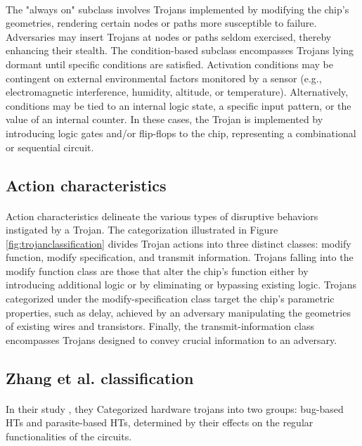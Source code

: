 \paragraph*{}
The "always on" subclass involves Trojans implemented by modifying the chip's geometries, rendering certain nodes or paths more susceptible to failure. Adversaries may insert Trojans at nodes or paths seldom exercised, thereby enhancing their stealth. The condition-based subclass encompasses Trojans lying dormant until specific conditions are satisfied. Activation conditions may be contingent on external environmental factors monitored by a sensor (e.g., electromagnetic interference, humidity, altitude, or temperature). Alternatively, conditions may be tied to an internal logic state, a specific input pattern, or the value of an internal counter. In these cases, the Trojan is implemented by introducing logic gates and/or flip-flops to the chip, representing a combinational or sequential circuit.
\subsection*{Action characteristics}
\paragraph*{}
Action characteristics delineate the various types of disruptive behaviors instigated by a Trojan. The categorization illustrated in Figure \ref{fig:trojanclassification} divides Trojan actions into three distinct classes: modify function, modify specification, and transmit information. Trojans falling into the modify function class are those that alter the chip's function either by introducing additional logic or by eliminating or bypassing existing logic. Trojans categorized under the modify-specification class target the chip's parametric properties, such as delay, achieved by an adversary manipulating the geometries of existing wires and transistors. Finally, the transmit-information class encompasses Trojans designed to convey crucial information to an adversary.
\subsection{Zhang et al. classification}
\paragraph*{}
In their study \cite{7086012}, they Categorized hardware trojans into two groups: bug-based HTs and parasite-based HTs, determined by their effects on the regular functionalities of the circuits.
